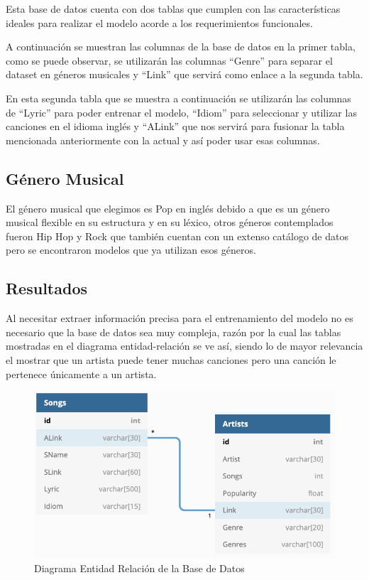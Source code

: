 \documentclass[12pt, a4paper, titlepage]{report}
\begin{document}
		Esta base de datos cuenta con dos tablas que cumplen con las características ideales para realizar el modelo acorde a los requerimientos funcionales.
		
		A continuación se muestran las columnas de la base de datos en la primer tabla, como se puede observar, se utilizarán las columnas “Genre” para separar el dataset en géneros musicales y “Link” que servirá como enlace a la segunda tabla.
		
		
		En esta segunda tabla que se muestra a continuación se utilizarán las columnas de “Lyric” para poder entrenar el modelo, “Idiom” para seleccionar y utilizar las canciones en el idioma inglés y “ALink” que nos servirá para fusionar la tabla mencionada anteriormente con la actual y así poder usar esas columnas.
		
		
		\subsection{Género Musical} %
		El género musical que elegimos es Pop en inglés debido a que es un género musical flexible en su estructura y en su léxico, otros géneros contemplados fueron Hip Hop y Rock que también cuentan con un extenso catálogo de datos pero se encontraron modelos que ya utilizan esos géneros.
		
		\subsection{Resultados}
		Al necesitar extraer información precisa para el entrenamiento del modelo no es necesario que la base de datos sea muy compleja, razón por la cual las tablas mostradas en el diagrama entidad-relación se ve así, siendo lo de mayor relevancia el mostrar que un artista puede tener muchas canciones pero una canción le pertenece únicamente a un artista.
		
		\begin{figure}[H]
			\includegraphics[width=15cm]{./imagenes/Disenio/Iteracion_1/Base de Datos/diagrama_ER_BD.jpg}
			\centering 
			\caption{Diagrama Entidad Relación de la Base de Datos}
		\end{figure}
		
\end{document}

